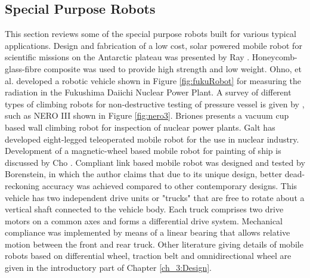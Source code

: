 \subsection{ Special Purpose Robots}
This section reviews some of the special purpose  robots built for various typical applications. 
Design and fabrication of a low cost, solar powered mobile robot for  scientific missions on the Antarctic plateau was presented by Ray  \cite{ray2005design}. Honeycomb-glass-fibre composite was used to provide high strength and low weight. Ohno, et al. \cite{ohno2011robotic}   developed a robotic  vehicle shown in Figure \ref{fig:fukuRobot} for measuring the radiation in the Fukushima Daiichi Nuclear Power Plant. A survey of different types of climbing robots for non-destructive testing of pressure vessel is given by \cite{luk2006tele}, such as NERO III shown in Figure \ref{fig:nero3}.  Briones \cite{briones1994wall} presents a vacuum cup based wall climbing robot for inspection of  nuclear power plants. Galt \cite{galt1997tele} has developed eight-legged teleoperated mobile robot for the use in nuclear industry. Development of a magnetic-wheel based mobile robot for painting of ship is discussed by Cho \cite{cho2013study}. Compliant link based mobile robot was designed and tested by Borenstein\cite{borenstein1995control}, in which the author claims that due to its unique design, better dead-reckoning accuracy was achieved compared to other contemporary designs. This vehicle has two independent drive units or "trucks" that are free to rotate about a vertical shaft connected to the vehicle body. Each truck comprises two drive motors on a common axes and forms a differential drive system. Mechanical compliance was implemented by means of a linear bearing that allows relative motion between the front and rear truck. Other literature giving details of  mobile robots based on   differential wheel, traction belt and omnidirectional wheel are given in the introductory part of Chapter \ref{ch_3:Design}.
